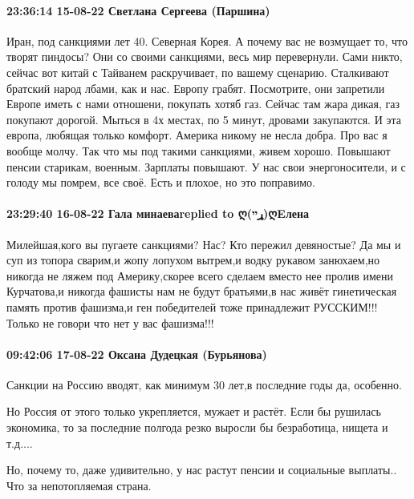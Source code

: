  
 
 
 
 

\paragraph{23:36:14 15-08-22 Светлана Сергеева (Паршина)}

Иран, под санкциями лет 40. Северная Корея. А почему вас не возмущает то, что
творят пиндосы? Они со своими санкциями, весь мир перевернули. Сами никто,
сейчас вот китай с Тайванем раскручивает, по вашему сценарию. Сталкивают
братский народ лбами, как и нас. Европу грабят. Посмотрите, они запретили
Европе иметь с нами отношени, покупать хотяб газ. Сейчас там жара дикая, газ
покупают дорогой. Мыться в 4х местах, по 5 минут, дровами закупаются. И эта
европа, любящая только комфорт. Америка никому не несла добра. Про вас я вообще
молчу. Так что мы под такими санкциями, живем хорошо. Повышают пенсии старикам,
военным. Зарплаты повышают. У нас свои энергоносители, и с голоду мы помрем,
все своё. Есть и плохое, но это поправимо.

\paragraph{23:29:40 16-08-22 Гала минаеваreplied to ღ(ړײ)ღEлена}

Милейшая,кого вы пугаете санкциями? Нас? Кто пережил девяностые? Да мы и суп из
топора сварим,и жопу лопухом вытрем,и водку рукавом занюхаем,но никогда не
ляжем под Америку,скорее всего сделаем вместо нее пролив имени Курчатова,и
никогда фашисты нам не будут братьями,в нас живёт гинетическая память против
фашизма,и ген победителей тоже принадлежит РУССКИМ!!! Только не говори что нет
у вас фашизма!!!

\paragraph{09:42:06 17-08-22 Оксана Дудецкая (Бурьянова)}

Санкции на Россию вводят, как минимум 30 лет,в последние годы да, особенно.

Но Россия от этого только укрепляется, мужает и растёт. Если бы рушилась
экономика, то за последние полгода резко выросли бы безработица, нищета и
т.д....

Но, почему то, даже удивительно, у нас растут пенсии и социальные выплаты.. Что
за непотопляемая страна.
